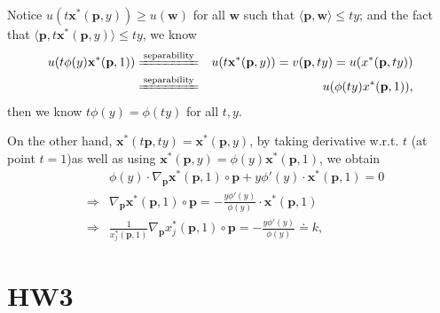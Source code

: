 \documentclass{article}
\newcommand{\1}{{\bf 1}}
\newcommand{\0}{{\mathbf{0}}}
\newcommand{\p}{{\mathbf{p}}}
\newcommand{\w}{{\mathbf{w}}}
\newcommand{\x}{{\mathbf{x}}}
\newcommand{\<}{\langle}
\renewcommand{\>}{\rangle}
\begin{document}
Notice $u(t \x^* (\p,y  ) ) \ge u(\w)$ for all $\w$ such that $\langle \p, \w\rangle \le  ty$; and the fact that $\langle \p, t \x^*(\p ,y) \rangle \le t y$, we know 
\begin{eqnarray*}
 u(t\phi(y) \x^*(\p, 1) ) & \xlongequal{\text{separability}} & u(t \x^*(\p,y )) = v(\p, t y ) = u(x^*(\p, ty)) \\
 & \xlongequal{\text{separability}} & u( \phi(ty)x^*(\p, 1)),
\end{eqnarray*}
then we know $t\phi(y) = \phi(ty)$ for all $t,y$.

On the other hand,
$\x^*(t\p,t y )  =\x^*(\p, y)$, by taking derivative w.r.t. $t$  (at point $t =1 $)as well as using $\x^*(\p,y ) = \phi(y) \x^*(\p,1)$, we obtain 
 \begin{eqnarray*}
&&  \phi(y)\cdot \nabla_{\p}\x^*(\p, 1 ) \circ \p + y \phi'(y)\cdot \x^*(\p,1) = 0 \\  & \Rightarrow & \nabla_{\p}\x^*(\p, 1 ) \circ \p = - \frac{y \phi'(y)}{\phi(y)}\cdot \x^*(\p,1) \\& \Rightarrow &  \frac{1}{x_j^*(\p,1) } \nabla_{\p}x_j^*(\p, 1 ) \circ \p  = - \frac{y  	\phi'(y)}{\phi(y)} \doteq k,
 \end{eqnarray*}


\section{HW3}
\end{document}
